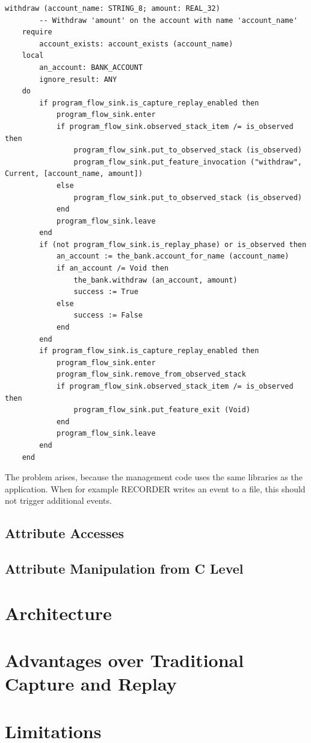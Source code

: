 \begin{lstlisting}
withdraw (account_name: STRING_8; amount: REAL_32)
		-- Withdraw 'amount' on the account with name 'account_name'
	require
		account_exists: account_exists (account_name)
	local
		an_account: BANK_ACCOUNT
		ignore_result: ANY
	do
		if program_flow_sink.is_capture_replay_enabled then
			program_flow_sink.enter
			if program_flow_sink.observed_stack_item /= is_observed then
				program_flow_sink.put_to_observed_stack (is_observed)
				program_flow_sink.put_feature_invocation ("withdraw", Current, [account_name, amount])
			else
				program_flow_sink.put_to_observed_stack (is_observed)
			end
			program_flow_sink.leave
		end
		if (not program_flow_sink.is_replay_phase) or is_observed then
			an_account := the_bank.account_for_name (account_name)
			if an_account /= Void then
				the_bank.withdraw (an_account, amount)
				success := True
			else
				success := False
			end
		end
		if program_flow_sink.is_capture_replay_enabled then
			program_flow_sink.enter
			program_flow_sink.remove_from_observed_stack
			if program_flow_sink.observed_stack_item /= is_observed then
				program_flow_sink.put_feature_exit (Void)
			end
			program_flow_sink.leave
		end
	end
\end{lstlisting}



The problem arises, because the management code uses the same libraries as the application. When for example RECORDER writes an event to a file, this should not trigger additional events.  

\subsection{Attribute Accesses}
\subsection{Attribute Manipulation from C Level}



\section{Architecture}
\section{Advantages over Traditional Capture and Replay}
\section{Limitations}
